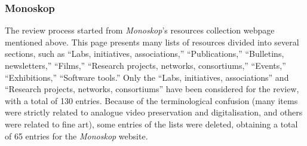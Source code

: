 \subsubsection*{Monoskop}
The review process started from \textit{Monoskop}’s resources collection webpage mentioned above. This page presents many lists of resources divided into several sections, such as ``Labs, initiatives, associations,'' ``Publications,'' ``Bulletins, newsletters,'' ``Films,'' ``Research projects, networks, consortiums,'' ``Events,'' ``Exhibitions,'' ``Software tools.'' Only the ``Labs, initiatives, associations'' and ``Research projects, networks, consortiums'' have been considered for the review, with a total of 130 entries. Because of the terminological confusion (many items were strictly related to analogue video preservation and digitalisation, and others were related to fine art), some entries of the lists were deleted, obtaining a total of 65 entries for the \textit{Monoskop} website.

